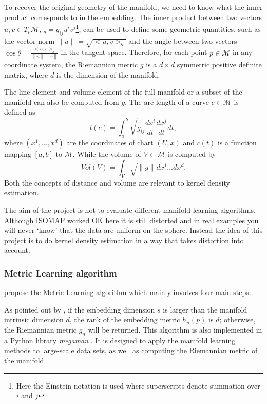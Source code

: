 \documentclass[11pt,a4paper,]{article}
\begin{document}
To recover the original geometry of the manifold, we need to know what the inner product corresponds to in the embedding.
The inner product between two vectors \(u,v \in T_p\mathcal{M}\), \(<u,v>_g=g_{ij}u^iv^j\)\footnote{Here the Einstein notation is used where superscripts denote summation over \(i\) and \(j\)}, can be used to define some geometric quantities, such as the vector norm \(\|u\|=\sqrt{<u,v>_g}\) and the angle between two vectors \(\cos{\theta}=\frac{<u,v>_g}{\|u\|\|v\|}\) in the tangent space. Therefore, for each point \(p\in \mathcal{M}\) in any coordinate system, the Riemannian metric \(g\) is a \(d\times d\) symmetric positive definite matrix, where \(d\) is the dimension of the manifold.

The line element and volume element of the full manifold or a subset of the manifold can also be computed from \(g\). The arc length of a curve \(c\in \mathcal{M}\) is defined as
\[
l(c)=\int_a^b \sqrt{g_{ij} \frac{dx^i}{dt} \frac{dx^j}{dt}} dt,
\]
where \((x^1,\dots,x^d)\) are the coordinates of chart \((U,x)\) and \(c(t)\) is a function mapping \([a,b]\) to \(\mathcal{M}\). While the volume of \(V\subset \mathcal{M}\) is computed by
\[
Vol(V)=\int_V \sqrt{\|g\|} dx^1\dots dx^d.
\]
Both the concepts of distance and volume are relevant to kernel density estimation.

The aim of the project is not to evaluate different manifold learning algorithms. Although ISOMAP worked OK here it is still distorted and in real examples you will never `know' that the data are uniform on the sphere. Instead the idea of this project is to do kernel density estimation in a way that takes distortion into account.

\hypertarget{metric-learning-algorithm}{%
\subsubsection{Metric Learning algorithm}\label{metric-learning-algorithm}}

\textcite{Perrault-Joncas2013-pq} propose the Metric Learning algorithm which mainly involves four main steps.

As pointed out by \textcite{Perrault-Joncas2013-pq}, if the embedding dimension \(s\) is larger than the manifold intrinsic dimension \(d\), the rank of the embedding metric \(h_n(p)\) is \(d\); otherwise, the Riemannian metric \(g_n\) will be returned.
This algorithm is also implemented in a Python library \emph{megaman} \autocite{McQueen2016-xz}. It is designed to apply the manifold learning methods to large-scale data sets, as well as computing the Riemannian metric of the manifold.
\end{document}
